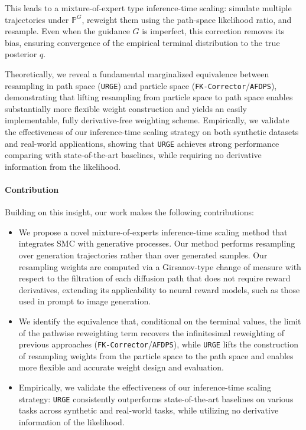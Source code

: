 \documentclass{article}
\theoremstyle{plain}
\theoremstyle{definition}
\theoremstyle{remark}
\renewcommand{\P}{{\mathbb{P}}}
\begin{document}
This leads to a mixture-of-expert type inference-time scaling: simulate multiple trajectories under $\P^G$, reweight them using the path-space likelihood ratio, and resample. Even when the guidance $G$ is imperfect, this correction removes its bias, ensuring convergence of the empirical terminal distribution to the true posterior $q$.

Theoretically, we reveal a fundamental marginalized equivalence between resampling in path space (\texttt{URGE}) and particle space (\texttt{FK-Corrector}/\texttt{AFDPS}), demonstrating that lifting resampling from particle space to path space enables substantially more flexible weight construction and yields an easily implementable, fully derivative-free weighting scheme. 
Empirically, we validate the effectiveness of our inference-time scaling strategy on both synthetic datasets and real-world applications, showing that \texttt{URGE} achieves strong performance comparing with state-of-the-art baselines, while requiring no derivative information from the likelihood.


\paragraph{Contribution}
Building on this insight, our work makes the following contributions:
\vspace{-0.1in}
\begin{itemize}[leftmargin=*,itemsep=5pt]
\setlength{\itemsep}{0pt}
\setlength{\parsep}{0pt}
\setlength{\parskip}{0pt}
\item We propose a novel mixture-of-experts inference-time scaling method that integrates SMC with generative processes. Our method performs resampling over generation trajectories rather than over generated samples. Our resampling weights are computed via a Girsanov-type change of measure with respect to the filtration of each diffusion path that does not require reward derivatives, extending its applicability to neural reward models, such as those used in prompt to image generation.
\item We identify the equivalence that, conditional on the terminal values, the limit of the pathwise reweighting term recovers the infinitesimal reweighting of previous approaches (\texttt{FK-Corrector}/\texttt{AFDPS}), while \texttt{URGE} lifts the construction of resampling weights from the particle space to the path space and enables more flexible and accurate weight design and evaluation.
\item Empirically, we validate the effectiveness of our inference-time scaling strategy: \texttt{URGE} consistently outperforms state-of-the-art baselines on various tasks across synthetic and real-world tasks, while utilizing no derivative information of the likelihood.
\end{itemize}
\end{document}
